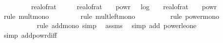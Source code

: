 \begin{isabellebody}
\ {\isachardoublequoteopen}{\isachardot}{\kern0pt}{\isachardot}{\kern0pt}{\isachardot}{\kern0pt}\ {\isasymle}\ {}{}\ {\isacharasterisk}{\kern0pt}\ {}{}\ {\isacharasterisk}{\kern0pt}\ {\isacharparenleft}{\kern0pt}{}{}\ {\isacharslash}{\kern0pt}\ {\isacharparenleft}{\kern0pt}real{\isacharunderscore}{\kern0pt}of{\isacharunderscore}{\kern0pt}rat\ {\isasymdelta}{\isacharparenright}{\kern0pt}\ {\isacharplus}{\kern0pt}\ {}\ {\isacharslash}{\kern0pt}\ \ {\isacharparenleft}{\kern0pt}real{\isacharunderscore}{\kern0pt}of{\isacharunderscore}{\kern0pt}rat\ {\isasymdelta}{\isacharparenright}{\kern0pt}\ {\isacharasterisk}{\kern0pt}\ {\isacharparenleft}{\kern0pt}{}\ powr\ {\isacharparenleft}{\kern0pt}{\isacharminus}{\kern0pt}{}\ {\isacharasterisk}{\kern0pt}\ log\ {}\ {\isacharparenleft}{\kern0pt}{}\ {\isacharslash}{\kern0pt}\ real{\isacharunderscore}{\kern0pt}of{\isacharunderscore}{\kern0pt}rat\ {\isasymdelta}{\isacharparenright}{\kern0pt}{\isacharparenright}{\kern0pt}\ {\isacharasterisk}{\kern0pt}\ {}\ powr\ {\isacharparenleft}{\kern0pt}{\isacharminus}{\kern0pt}{}{}{\isacharparenright}{\kern0pt}{\isacharparenright}{\kern0pt}{\isachardoublequoteclose}\isanewline
\ \ \ \ \isamarkupfalse%
\ {\isacharparenleft}{\kern0pt}rule\ mult{\isacharunderscore}{\kern0pt}mono{\isacharparenright}{\kern0pt}\isanewline
\ \ \ \ \ \ \ \isamarkupfalse%
\ {\isacharparenleft}{\kern0pt}rule\ mult{\isacharunderscore}{\kern0pt}left{\isacharunderscore}{\kern0pt}mono{\isacharparenright}{\kern0pt}\isanewline
\ \ \ \ \ \ \ \ \isamarkupfalse%
\ {\isacharparenleft}{\kern0pt}rule\ power{\isacharunderscore}{\kern0pt}mono{\isacharparenright}{\kern0pt}\isanewline
\ \ \ \ \ \ \ \ \ \isamarkupfalse%
\ {\isacharparenleft}{\kern0pt}rule\ add{\isacharunderscore}{\kern0pt}mono{\isacharcomma}{\kern0pt}\ simp{\isacharparenright}{\kern0pt}\ \isamarkupfalse%
\ assms{\isacharparenleft}{\kern0pt}{}{\isacharparenright}{\kern0pt}\ \isamarkupfalse%
\ {\isacharparenleft}{\kern0pt}simp\ add{\isacharcolon}{\kern0pt}\ power{\isacharunderscore}{\kern0pt}le{\isacharunderscore}{\kern0pt}one{\isacharparenright}{\kern0pt}\isanewline
\ \ \ \ \isamarkupfalse%
\ {\isacharparenleft}{\kern0pt}simp\ add{\isacharcolon}{\kern0pt}powr{\isacharunderscore}{\kern0pt}diff{\isacharparenright}{\kern0pt}{\isacharplus}{\kern0pt}\isanewline

\end{isabellebody}
